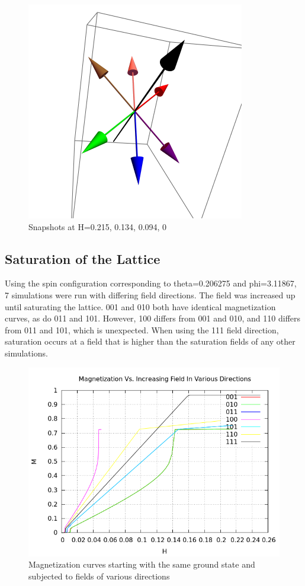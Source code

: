 \begin{figure}[ht]
\includegraphics[scale=0.37]{25june16/HVariedData/Pictures/011Dec216.png}
\caption{Snapshots at H=0.215, 0.134, 0.094, 0}
\end{figure}

\subsection{Saturation of the Lattice}
Using the spin configuration corresponding to theta=0.206275 and phi=3.11867, 7 simulations were run with differing field directions. The field was increased up until saturating the lattice. 001 and 010 both have identical magnetization curves, as do 011 and 101. However, 100 differs from 001 and 010, and 110 differs from 011 and 101, which is unexpected. When using the 111 field direction, saturation occurs at a field that is higher than the saturation fields of any other simulations. 
\begin{figure}[ht]
 \centering
 \includegraphics[scale=0.6]{25june16/HVariedData/Increasing/IncreasingField.png}
 \caption{Magnetization curves starting with the same ground state and subjected to fields of various directions}
\end{figure}
\clearpage

